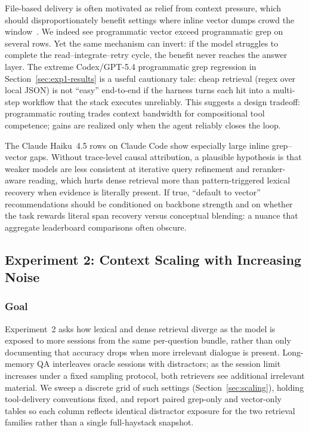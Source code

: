 \documentclass[sigconf,nonacm]{acmart}
\begin{document}
File-based delivery is often motivated as relief from context pressure, which should disproportionately benefit settings where inline vector dumps crowd the window~\cite{packer2023memgpt,liu2023lostinmiddle}. We indeed see programmatic vector exceed programmatic grep on several rows. Yet the same mechanism can invert: if the model struggles to complete the read--integrate--retry cycle, the benefit never reaches the answer layer. The extreme Codex/GPT-5.4 programmatic grep regression in Section~\ref{sec:exp1-results} is a useful cautionary tale: cheap retrieval (regex over local JSON) is not ``easy'' end-to-end if the harness turns each hit into a multi-step workflow that the stack executes unreliably. This suggests a design tradeoff: programmatic routing trades context bandwidth for compositional tool competence; gains are realized only when the agent reliably closes the loop.


The Claude Haiku~4.5 rows on Claude Code show especially large inline grep--vector gaps. Without trace-level causal attribution, a plausible hypothesis is that weaker models are less consistent at iterative query refinement and reranker-aware reading, which hurts dense retrieval more than pattern-triggered lexical recovery when evidence is literally present. If true, ``default to vector'' recommendations should be conditioned on backbone strength and on whether the task rewards literal span recovery versus conceptual blending: a nuance that aggregate leaderboard comparisons often obscure.


\subsection{Experiment 2: Context Scaling with Increasing Noise}
\label{sec:exp2}

\subsubsection{Goal}
\label{sec:exp2-goal}
Experiment~2 asks how lexical and dense retrieval diverge as the model is exposed to more sessions from the same per-question bundle, rather than only documenting that accuracy drops when more irrelevant dialogue is present.
Long-memory QA interleaves oracle sessions with distractors; as the session limit increases under a fixed sampling protocol, both retrievers see additional irrelevant material.
We sweep a discrete grid of such settings (Section~\ref{sec:scaling}), holding tool-delivery conventions fixed, and report paired grep-only and vector-only tables so each column reflects identical distractor exposure for the two retrieval families rather than a single full-haystack snapshot.
\end{document}
